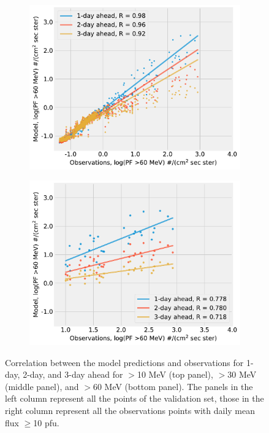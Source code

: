 \begin{figure}[htp]
\begin{subfigure}{0.4\textwidth}
         \includegraphics[width=\textwidth]{chapter4/figs/scatterplot_obs_vs_model_valset_3in1_log_PF60.pdf}
    \end{subfigure}
    \begin{subfigure}{0.4\textwidth}
         \centering
         \includegraphics[width=\textwidth]{chapter4/figs/scatterplot_obs_vs_model_valset_3in1_LOG_PF_LT1_log_PF60.pdf}
    \end{subfigure}
\caption{Correlation between the model predictions and observations for 1-day, 2-day, and 3-day ahead for $>$10 MeV (top panel), $>$30 MeV (middle panel), and $>$60 MeV (bottom panel). The panels in the left column represent all the points of the validation set, those in the right column represent all the observations points with daily mean flux $\geq$10 pfu.}
\label{fig_model_vs_obs_valset}
\end{figure}

